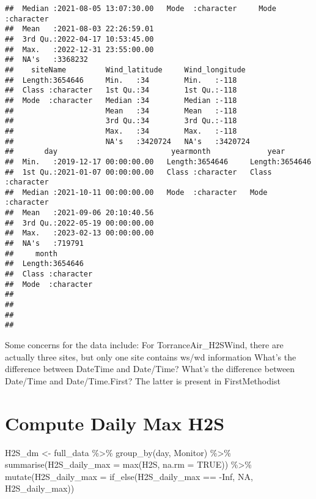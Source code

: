 \documentclass[
]{article}
\newenvironment{Shaded}{\begin{snugshade}}{\end{snugshade}}
\newcommand{\AttributeTok}[1]{\textcolor[rgb]{0.77,0.63,0.00}{#1}}
\newcommand{\ConstantTok}[1]{\textcolor[rgb]{0.00,0.00,0.00}{#1}}
\newcommand{\FunctionTok}[1]{\textcolor[rgb]{0.00,0.00,0.00}{#1}}
\newcommand{\NormalTok}[1]{#1}
\newcommand{\OtherTok}[1]{\textcolor[rgb]{0.56,0.35,0.01}{#1}}
\newcommand{\SpecialCharTok}[1]{\textcolor[rgb]{0.00,0.00,0.00}{#1}}
\begin{document}
\begin{verbatim}
##  Median :2021-08-05 13:07:30.00   Mode  :character     Mode  :character  
##  Mean   :2021-08-03 22:26:59.01                                          
##  3rd Qu.:2022-04-17 10:53:45.00                                          
##  Max.   :2022-12-31 23:55:00.00                                          
##  NA's   :3368232                                                         
##    siteName         Wind_latitude     Wind_longitude   
##  Length:3654646     Min.   :34        Min.   :-118     
##  Class :character   1st Qu.:34        1st Qu.:-118     
##  Mode  :character   Median :34        Median :-118     
##                     Mean   :34        Mean   :-118     
##                     3rd Qu.:34        3rd Qu.:-118     
##                     Max.   :34        Max.   :-118     
##                     NA's   :3420724   NA's   :3420724  
##       day                          yearmonth             year          
##  Min.   :2019-12-17 00:00:00.00   Length:3654646     Length:3654646    
##  1st Qu.:2021-01-07 00:00:00.00   Class :character   Class :character  
##  Median :2021-10-11 00:00:00.00   Mode  :character   Mode  :character  
##  Mean   :2021-09-06 20:10:40.56                                        
##  3rd Qu.:2022-05-19 00:00:00.00                                        
##  Max.   :2023-02-13 00:00:00.00                                        
##  NA's   :719791                                                        
##     month          
##  Length:3654646    
##  Class :character  
##  Mode  :character  
##                    
##                    
##                    
## 
\end{verbatim}

Some concerns for the data include: For TorranceAir\_H2SWind, there are
actually three sites, but only one site contains ws/wd information
What's the difference between DateTime and Date/Time? What's the
difference between Date/Time and Date/Time.First? The latter is present
in FirstMethodist

\hypertarget{compute-daily-max-h2s}{%
\section{Compute Daily Max H2S}\label{compute-daily-max-h2s}}

\begin{Shaded}
\begin{Highlighting}[]
\NormalTok{H2S\_dm }\OtherTok{\textless{}{-}}\NormalTok{ full\_data }\SpecialCharTok{\%\textgreater{}\%}
  \FunctionTok{group\_by}\NormalTok{(day, Monitor) }\SpecialCharTok{\%\textgreater{}\%}
  \FunctionTok{summarise}\NormalTok{(}\AttributeTok{H2S\_daily\_max =} \FunctionTok{max}\NormalTok{(H2S, }\AttributeTok{na.rm =} \ConstantTok{TRUE}\NormalTok{)) }\SpecialCharTok{\%\textgreater{}\%}
  \FunctionTok{mutate}\NormalTok{(}\AttributeTok{H2S\_daily\_max =} \FunctionTok{if\_else}\NormalTok{(H2S\_daily\_max }\SpecialCharTok{==} \SpecialCharTok{{-}}\ConstantTok{Inf}\NormalTok{, }\ConstantTok{NA}\NormalTok{, H2S\_daily\_max))}
\end{Highlighting}
\end{Shaded}
\end{document}
